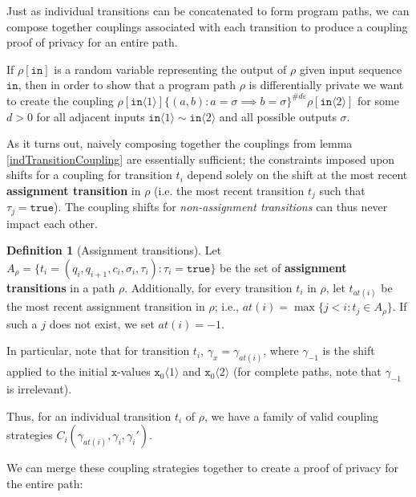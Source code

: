 \documentclass[12pt]{article}
\newcommand{\brangle}[1]{\langle#1 \rangle}
\theoremstyle{definition}
\newtheorem{defn}[thm]{Definition}
\begin{document}
Just as individual transitions can be concatenated to form program paths, we can compose together couplings associated with each transition to produce a coupling proof of privacy for an entire path. 

If $\rho[\texttt{in}]$ is a random variable representing the output of $\rho$ given input sequence $\texttt{in}$, then in order to show that a program path $\rho$ is differentially private we want to create the coupling $\rho[\texttt{in}\brangle{1}]\{(a, b): a=\sigma\implies b=\sigma\}^{\#d\varepsilon}\rho[\texttt{in}\brangle{2}]$ for some $d>0$ for all adjacent inputs $\texttt{in}\brangle{1}\sim\texttt{in}\brangle{2}$ and all possible outputs $\sigma$.

As it turns out, naively composing together the couplings from lemma \ref{indTransitionCoupling} are essentially sufficient; the constraints imposed upon shifts for a coupling for transition $t_i$ depend solely on the shift at the most recent \textbf{assignment transition} in $\rho$ (i.e. the most recent transition $t_j$ such that $\tau_j = \texttt{true}$). 
The coupling shifts for \textit{non-assignment transitions} can thus never impact each other. 

\begin{defn}[Assignment transitions]
    Let $A_\rho = \{t_i=(q_i, q_{i+1}, c_i, \sigma_i, \tau_i): \tau_i = \texttt{true}\}$ be the set of \textbf{assignment transitions} in a path $\rho$. Additionally, for every transition $t_i$ in $\rho$, let $t_{at(i)}$ be the most recent assignment transition in $\rho$; i.e., $at(i) = \max\{j<i: t_j\in A_\rho\}$. If such a $j$ does not exist, we set $at(i)=-1$. 
\end{defn}

In particular, note that for transition $t_i$, $\gamma_x = \gamma_{at(i)}$, where $\gamma_{-1}$ is the shift applied to the initial $\texttt{x}$-values $\texttt{x}_0\brangle{1}$ and $\texttt{x}_0\brangle{2}$ (for complete paths, note that $\gamma_{-1}$ is irrelevant).

Thus, for an individual transition $t_i$ of $\rho$, we have a family of valid coupling strategies $C_i(\gamma_{at(i)}, \gamma_i, \gamma_i')$. 

We can merge these coupling strategies together to create a proof of privacy for the entire path: 
\end{document}
